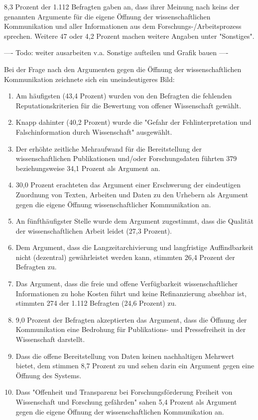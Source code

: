 8,3 Prozent der 1.112 Befragten gaben an, dass ihrer Meinung nach keins der genannten Argumente für die eigene Öffnung der wissenschaftlichen Kommunikation und aller Informationen aus dem Forschungs-/Arbeitsprozess sprechen. Weitere 47 oder 4,2 Prozent machen weitere Angaben unter "Sonstiges".

---- Todo: weiter ausarbeiten v.a. Sonstige aufteilen und Grafik bauen ----

Bei der Frage nach den Argumenten gegen die Öffnung der wissenschaftlichen Kommunikation zeichnete sich ein uneindeutigeres Bild:
\begin{enumerate}
\item Am häufigsten (43,4 Prozent) wurden von den Befragten die fehlenden Reputationskriterien für die Bewertung von offener Wissenschaft gewählt.
\item Knapp dahinter (40,2 Prozent) wurde die "Gefahr der Fehlinterpretation und Falschinformation durch Wissenschaft" ausgewählt.
\item Der erhöhte zeitliche Mehraufwand für die Bereitstellung der wissenschaftlichen Publikationen und/oder Forschungsdaten führten 379 beziehungsweise 34,1 Prozent als Argument an.
\item 30,0 Prozent erachteten das Argument einer Erschwerung der eindeutigen Zuordnung von Texten, Arbeiten und Daten zu den Urhebern als Argument gegen die eigene Öffnung wissenschaftlicher Kommunikation an.
\item  An fünfthäufigster Stelle wurde dem Argument zugestimmt, dass die Qualität der wissenschaftlichen Arbeit leidet (27,3 Prozent).
\item Dem Argument, dass die Langzeitarchivierung und langfristige Auffindbarkeit nicht (dezentral) gewährleistet werden kann, stimmten 26,4 Prozent der Befragten zu.
\item Das Argument, dass die freie und offene Verfügbarkeit wissenschaftlicher Informationen zu hohe Kosten führt und keine Refinanzierung absehbar ist, stimmten 274 der 1.112 Befragten (24,6 Prozent) zu.
\item 9,0 Prozent der Befragten akzeptierten das Argument, dass die Öffnung der Kommunikation eine Bedrohung für Publikations- und Pressefreiheit in der Wissenschaft darstellt.
\item Dass die offene Bereitstellung von Daten keinen nachhaltigen Mehrwert bietet, dem stimmen 8,7 Prozent zu und sehen darin ein Argument gegen eine Öffnung des Systems.
\item Dass "Offenheit und Transparenz bei Forschungsförderung Freiheit von Wissenschaft und Forschung gefährden" sahen 5,4 Prozent als Argument gegen die eigene Öffnung der wissenschaftlichen Kommunikation an.
\end{enumerate}

